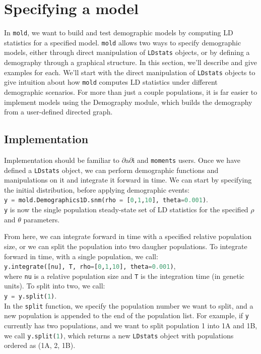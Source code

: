\documentclass[11pt]{article}
\makeatletter
\newcommand{\dadi}{$\partial$a$\partial$i\xspace}
\newcommand{\mold}{\texttt{mold}\xspace}
\newcommand{\py}[1]{\lstinline[breaklines=true,language=Python, showstringspaces=False]@#1@}
\makeatother
\begin{document}
\section{Specifying a model}

In \mold, we want to build and test demographic models by computing LD statistics for a specified model.
\mold allows two ways to specify demographic models, either through direct manipulation of \py{LDstats} objects, or by defining a demography through a graphical structure.
In this section, we'll describe and give examples for each.
We'll start with the direct manipulation of \py{LDstats} objects to give intuition about how \mold computes LD statistics under different demographic scenarios.
For more than just a couple populations, it is far easier to implement models using the Demography module, which builds the demography from a user-defined directed graph.

\subsection{Implementation}

Implementation should be familiar to \dadi and \py{moments} users.
Once we have defined a \py{LDstats} object, we can perform demographic functions and manipulations on it and integrate it forward in time.
We can start by specifying the initial distribution, before applying demographic events:\\
\py{y = mold.Demographics1D.snm(rho = [0,1,10], theta=0.001)}.\\
\py{y} is now the single population steady-state set of LD statistics for the specified $\rho$ and $\theta$ parameters.

From here, we can integrate forward in time with a specified relative population size, or we can split the population into two daugher populations.
To integrate forward in time, with a single population, we call:\\
\py{y.integrate([nu], T, rho=[0,1,10], theta=0.001)},\\
where \py{nu} is a relative population size and \py{T} is the integration time (in genetic units).
To split into two, we call:\\
\py{y = y.split(1)}.\\
In the \py{split} function, we specify the population number we want to split, and a new population is appended to the end of the population list.
For example, if \py{y} currently has two populations, and we want to split population 1 into 1A and 1B, we call \py{y.split(1)}, which returns a new \py{LDstats} object with populations ordered as (1A, 2, 1B).
\end{document}
